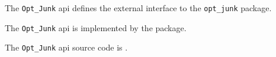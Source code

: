 The {\tt Opt\_Junk} api defines the external interface to the {\tt opt\_junk} package.

The {\tt Opt\_Junk} api is implemented by the  package.

The {\tt Opt\_Junk} api source code is .

